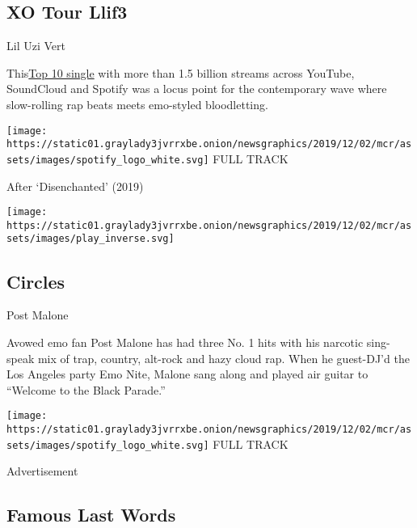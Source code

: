 \hypertarget{xo-tour-llif3}{%
\subsection{XO Tour Llif3}\label{xo-tour-llif3}}

Lil Uzi Vert

This\href{https://www.nytimes3xbfgragh.onion/interactive/2017/08/13/arts/lil-uzi-vert-xo-tour-llif3-push-me-to-the-edge.html}{}\href{https://www.nytimes3xbfgragh.onion/interactive/2017/08/13/arts/lil-uzi-vert-xo-tour-llif3-push-me-to-the-edge.html}{Top
10 single} with more than 1.5 billion streams across YouTube, SoundCloud
and Spotify was a locus point for the contemporary wave where
slow-rolling rap beats meets emo-styled bloodletting.

\href{https://open.spotify.com/track/7GX5flRQZVHRAGd6B4TmDO?si=MZq8akY0RE2aALh9QuWMsA}{}

\texttt{[image: https://static01.graylady3jvrrxbe.onion/newsgraphics/2019/12/02/mcr/assets/images/spotify\_logo\_white.svg]}
FULL TRACK

After `Disenchanted' (2019)

\texttt{[image: https://static01.graylady3jvrrxbe.onion/newsgraphics/2019/12/02/mcr/assets/images/play\_inverse.svg]}

\hypertarget{circles}{%
\subsection{Circles}\label{circles}}

Post Malone

Avowed emo fan Post Malone has had three No. 1 hits with his narcotic
sing-speak mix of trap, country, alt-rock and hazy cloud rap. When he
guest-DJ'd the Los Angeles party Emo Nite, Malone sang along and played
air guitar to ``Welcome to the Black Parade.''

\href{https://open.spotify.com/track/21jGcNKet2qwijlDFuPiPb?si=9ulrlsODQ62yz_NbWR3XMQ}{}

\texttt{[image: https://static01.graylady3jvrrxbe.onion/newsgraphics/2019/12/02/mcr/assets/images/spotify\_logo\_white.svg]}
FULL TRACK

Advertisement

\hypertarget{famous-last-words}{%
\subsection{Famous Last Words}\label{famous-last-words}}

